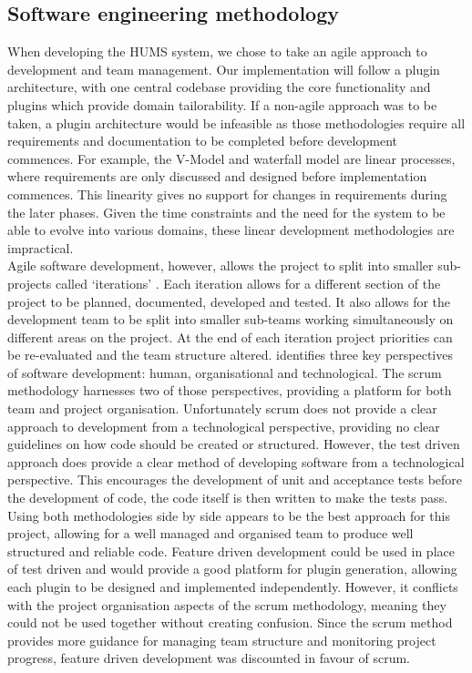 \documentclass[10pt,a4paper]{article}
\begin{document}
\subsection{Software engineering methodology}
When developing the HUMS system, we chose to take an agile approach to development and team management. Our implementation will follow a plugin architecture, with one central codebase providing the core functionality and plugins which provide domain tailorability. If a non-agile approach was to be taken, a plugin architecture would be infeasible as those methodologies require all requirements and documentation to be completed before development commences. For example, the V-Model and waterfall model are linear processes, where requirements are only discussed and designed before implementation commences. This linearity gives no support for changes in requirements during the later phases. Given the time constraints and the need for the system to be able to evolve into various domains, these linear development methodologies are impractical. \\
Agile software development, however, allows the project to split into smaller sub-projects called `iterations' \cite{hazzan2008agile}. Each iteration allows for a different section of the project to be planned, documented, developed and tested. It also allows for the development team to be split into smaller sub-teams working simultaneously on different areas on the project. At the end of each iteration project priorities can be re-evaluated and the team structure altered. 
\cite{hazzan2008agile} identifies three key perspectives of software development: human, organisational and technological. The scrum methodology harnesses two of those perspectives, providing a platform for both team and project organisation. Unfortunately scrum does not provide a clear approach to development from a technological perspective, providing no clear guidelines on how code should be created or structured. However, the test driven approach does provide a clear method of developing software from a technological perspective. This encourages the development of unit and acceptance tests before the development of code, the code itself is then written to make the tests pass. Using both methodologies side by side appears to be the best approach for this project, allowing for a well managed and organised team to produce well structured and reliable code. Feature driven development could be used in place of test driven and would provide a good platform for plugin generation, allowing each plugin to be designed and implemented independently. However, it conflicts with the project organisation aspects of the scrum methodology, meaning they could not be used together without creating confusion. Since the scrum method provides more guidance for managing team structure and monitoring project progress, feature driven development was discounted in favour of scrum.
\end{document}
